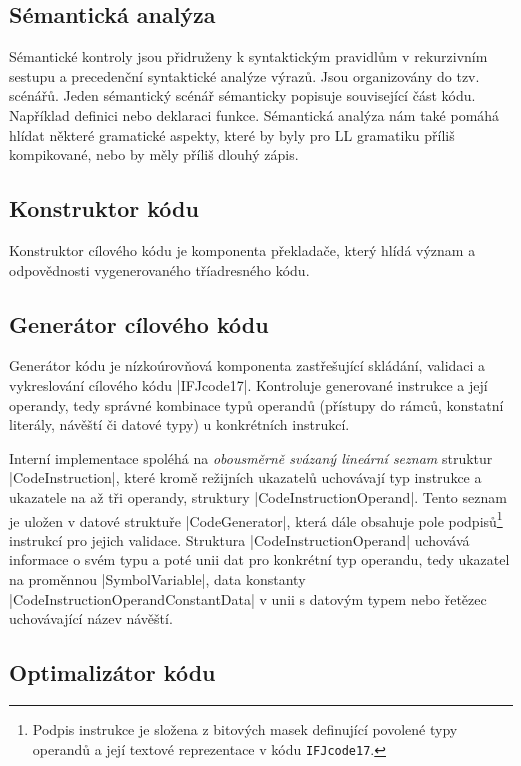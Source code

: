 \subsection{Sémantická analýza}
Sémantické kontroly jsou přidruženy k syntaktickým pravidlům v rekurzivním sestupu a
precedenční syntaktické analýze výrazů. Jsou organizovány do tzv. scénářů. Jeden
sémantický scénář sémanticky popisuje související část kódu. Například definici
nebo deklaraci funkce. Sémantická analýza nám také pomáhá hlídat některé gramatické aspekty,
které by byly pro LL gramatiku příliš kompikované, nebo by měly příliš dlouhý zápis.


\subsection{Konstruktor kódu}
\label{subsec:code-constructor}
Konstruktor cílového kódu je komponenta překladače, který hlídá význam a odpovědnosti vygenerovaného tříadresného kódu.

\subsection{Generátor cílového kódu}
Generátor kódu je nízkoúrovňová komponenta zastřešující skládání, validaci a vykreslování cílového kódu \ic|IFJcode17|.
Kontroluje generované instrukce a její operandy, tedy správné kombinace typů operandů (přístupy do rámců, konstatní
literály, návěští či datové typy) u konkrétních instrukcí.

Interní implementace spoléhá na \emph{obousměrně svázaný lineární seznam} struktur \ic|CodeInstruction|, které kromě
režijních ukazatelů uchovávají typ instrukce a ukazatele na až tři operandy, struktury \ic|CodeInstructionOperand|.
Tento seznam je uložen v datové struktuře \ic|CodeGenerator|, která dále obsahuje pole podpisů\footnote{Podpis
instrukce je složena z bitových masek definující povolené typy operandů a její textové reprezentace v kódu
\texttt{IFJcode17}.} instrukcí pro jejich validace.
Struktura \ic|CodeInstructionOperand| uchovává informace o svém typu a poté unii dat pro konkrétní typ operandu, tedy
ukazatel na proměnnou \ic|SymbolVariable|,
data konstanty \ic|CodeInstructionOperandConstantData| v unii s datovým typem nebo řetězec uchovávající název návěští.
\subsection{Optimalizátor kódu}

